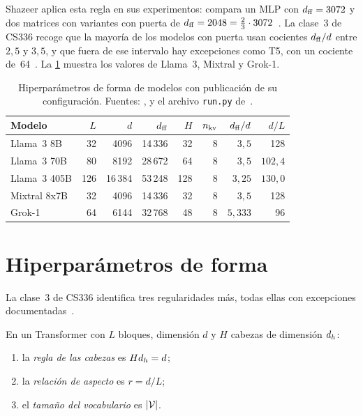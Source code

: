 Shazeer aplica esta regla en sus experimentos: compara un MLP con $d_{\mathrm{ff}}=3072$ y dos matrices con variantes con puerta de $d_{\mathrm{ff}}=2048=\frac23\cdot 3072$~\cite[§3.1]{shazeerglu}. La clase~3 de CS336 recoge que la mayoría de los modelos con puerta usan cocientes $d_{\mathrm{ff}}/d$ entre $2{,}5$ y $3{,}5$, y que fuera de ese intervalo hay excepciones como T5, con un cociente de~64~\cite{cs336}. La \cref{tab:hiper} muestra los valores de Llama~3, Mixtral y Grok-1.

\begin{table}[ht]
\centering\small
\caption{Hiperparámetros de forma de modelos con publicación de su configuración. Fuentes: \cite[tabla~3]{llama3}, \cite[tabla~1]{mixtral} y el archivo \texttt{run.py} de~\cite{grok1}.}\label{tab:hiper}
\begin{tabular}{@{}lrrrrrrr@{}}
\toprule
Modelo & $L$ & $d$ & $d_{\mathrm{ff}}$ & $H$ & $n_{\mathrm{kv}}$ & $d_{\mathrm{ff}}/d$ & $d/L$ \\
\midrule
Llama~3 8B & 32 & 4096 & 14\,336 & 32 & 8 & $3{,}5$ & 128 \\
Llama~3 70B & 80 & 8192 & 28\,672 & 64 & 8 & $3{,}5$ & $102{,}4$ \\
Llama~3 405B & 126 & 16\,384 & 53\,248 & 128 & 8 & $3{,}25$ & $130{,}0$ \\
Mixtral 8x7B & 32 & 4096 & 14\,336 & 32 & 8 & $3{,}5$ & 128 \\
Grok-1 & 64 & 6144 & 32\,768 & 48 & 8 & $5{,}333$ & 96 \\
\bottomrule
\end{tabular}
\end{table}

\section{Hiperparámetros de forma}

La clase~3 de CS336 identifica tres regularidades más, todas ellas con excepciones documentadas~\cite{cs336}.

\begin{definicion}\label{def:forma}
En un Transformer con $L$ bloques, dimensión $d$ y $H$ cabezas de dimensión $d_{h}$:
\begin{enumerate}
  \item la \emph{regla de las cabezas} es $Hd_{h}=d$;
  \item la \emph{relación de aspecto} es $r=d/L$;
  \item el \emph{tamaño del vocabulario} es $\lvert\mathcal{V}\rvert$.
\end{enumerate}
\end{definicion}

